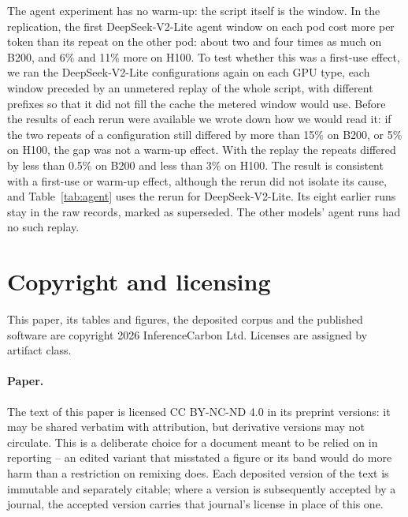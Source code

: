\documentclass[11pt]{article}
\begin{document}
The agent experiment has no warm-up: the script itself is the window. In the replication, the first DeepSeek-V2-Lite agent window on each pod cost more per token than its repeat on the other pod: about two and four times as much on B200, and 6\% and 11\% more on H100. To test whether this was a first-use effect, we ran the DeepSeek-V2-Lite configurations again on each GPU type, each window preceded by an unmetered replay of the whole script, with different prefixes so that it did not fill the cache the metered window would use. Before the results of each rerun were available we wrote down how we would read it: if the two repeats of a configuration still differed by more than 15\% on B200, or 5\% on H100, the gap was not a warm-up effect. With the replay the repeats differed by less than 0.5\% on B200 and less than 3\% on H100. The result is consistent with a first-use or warm-up effect, although the rerun did not isolate its cause, and Table~\ref{tab:agent} uses the rerun for DeepSeek-V2-Lite. Its eight earlier runs stay in the raw records, marked as superseded. The other models' agent runs had no such replay.

\section{Copyright and licensing}\label{app:license}

This paper, its tables and figures, the deposited corpus and the published software are copyright 2026 InferenceCarbon Ltd. Licenses are assigned by artifact class.

\paragraph{Paper.} The text of this paper is licensed CC BY-NC-ND 4.0 in its preprint versions: it may be shared verbatim with attribution, but derivative versions may not circulate. This is a deliberate choice for a document meant to be relied on in reporting -- an edited variant that misstated a figure or its band would do more harm than a restriction on remixing does. Each deposited version of the text is immutable and separately citable; where a version is subsequently accepted by a journal, the accepted version carries that journal's license in place of this one.
\end{document}
